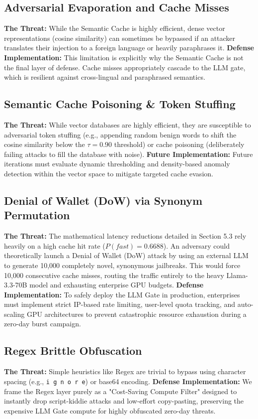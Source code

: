\documentclass[12pt,a4paper]{article}
\begin{document}
\subsection{Adversarial Evaporation and Cache Misses}
\textbf{The Threat:} While the Semantic Cache is highly efficient, dense vector representations (cosine similarity) can sometimes be bypassed if an attacker translates their injection to a foreign language or heavily paraphrases it.
\textbf{Defense Implementation:} This limitation is explicitly why the Semantic Cache is not the final layer of defense. Cache misses appropriately cascade to the LLM gate, which is resilient against cross-lingual and paraphrased semantics. 

\subsection{Semantic Cache Poisoning \& Token Stuffing}
\textbf{The Threat:} While vector databases are highly efficient, they are susceptible to adversarial token stuffing (e.g., appending random benign words to shift the cosine similarity below the $\tau=0.90$ threshold) or cache poisoning (deliberately failing attacks to fill the database with noise).
\textbf{Future Implementation:} Future iterations must evaluate dynamic thresholding and density-based anomaly detection within the vector space to mitigate targeted cache evasion.

\subsection{Denial of Wallet (DoW) via Synonym Permutation}
\textbf{The Threat:} The mathematical latency reductions detailed in Section 5.3 rely heavily on a high cache hit rate ($P(fast)=0.6688$). An adversary could theoretically launch a Denial of Wallet (DoW) attack by using an external LLM to generate 10,000 completely novel, synonymous jailbreaks. This would force 10,000 consecutive cache misses, routing the traffic entirely to the heavy Llama-3.3-70B model and exhausting enterprise GPU budgets.
\textbf{Defense Implementation:} To safely deploy the LLM Gate in production, enterprises must implement strict IP-based rate limiting, user-level quota tracking, and auto-scaling GPU architectures to prevent catastrophic resource exhaustion during a zero-day burst campaign.

\subsection{Regex Brittle Obfuscation}
\textbf{The Threat:} Simple heuristics like Regex are trivial to bypass using character spacing (e.g., \texttt{i g n o r e}) or base64 encoding.
\textbf{Defense Implementation:} We frame the Regex layer purely as a "Cost-Saving Compute Filter" designed to instantly drop script-kiddie attacks and low-effort copy-pasting, preserving the expensive LLM Gate compute for highly obfuscated zero-day threats.
\end{document}
